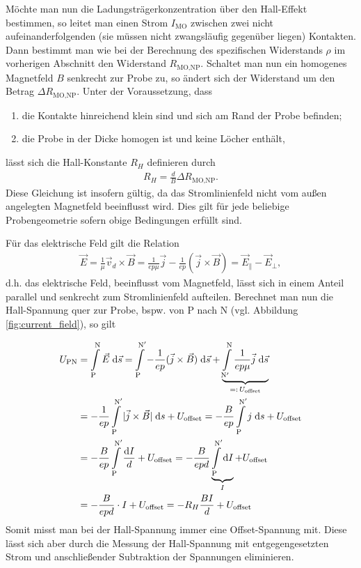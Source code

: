 \newpage
Möchte man nun die Ladungsträgerkonzentration über den Hall-Effekt bestimmen, so leitet man einen Strom $I_\text{MO}$ zwischen zwei nicht aufeinanderfolgenden (sie müssen nicht zwangsläufig gegenüber liegen) Kontakten. Dann bestimmt man wie bei der Berechnung des spezifischen Widerstands $\rho$ im vorherigen Abschnitt den Widerstand $R_\text{MO,NP}$. Schaltet man nun ein homogenes Magnetfeld $B$ senkrecht zur Probe zu, so ändert sich der Widerstand um den Betrag $\Delta R_\text{MO,NP}$.
Unter der Voraussetzung, dass
\begin{enumerate}
\item die Kontakte hinreichend klein sind und sich am Rand der Probe befinden;
\item die Probe in der Dicke homogen ist und keine Löcher enthält,
\end{enumerate}
lässt sich die Hall-Konstante $R_H$ definieren durch
\begin{align}
R_H=\frac{d}{B}\Delta R_\text{MO,NP}.
\end{align}
Diese Gleichung ist insofern gültig, da das Stromlinienfeld nicht vom außen angelegten Magnetfeld beeinflusst wird. Dies gilt für jede beliebige Probengeometrie sofern obige Bedingungen erfüllt sind.

Für das elektrische Feld gilt die Relation
\begin{align}
\vec{E}=\frac{1}{\mu}\vec{v}_d\times \vec{B}=\frac{1}{ep\mu}\vec{j}-\frac{1}{ep}(\vec{j}\times \vec{B})=\vec{E}_{\parallel}-\vec{E}_{\perp},
\end{align}
d.h. das elektrische Feld, beeinflusst vom Magnetfeld, lässt sich in einem Anteil parallel und senkrecht zum Stromlinienfeld aufteilen. Berechnet man nun die Hall-Spannung quer zur Probe, bspw. von P nach N (vgl. Abbildung \ref{fig:current_field}), so gilt

\begin{align}
U_\text{PN}&=\int\limits_{\mathrm{P}}^{\mathrm{N}}\vec{E}\;\mathrm{d} \vec{s}
=\int\limits_{\mathrm{P}}^{\mathrm{N}^\prime}-\frac{1}{ep}(\vec{j}\times \vec{B})\;\mathrm{d}\vec{s}
+\underbrace{\int\limits_{\mathrm{N}^\prime}^{\mathrm{N}}\frac{1}{ep\mu}\vec{j}\;\mathrm{d} \vec{s}}_{=:\, U_\text{offset}}\notag\\
&=-\frac{1}{ep}\int\limits_{\mathrm{P}}^{\mathrm{N}^\prime}|\vec{j}\times\vec{B}|\;\mathrm{d} s  +  U_\text{offset}
=-\frac{B}{ep}\int\limits_{\mathrm{P}}^{\mathrm{N}^\prime}j\;\mathrm{d} s  +  U_\text{offset}\notag\\
&=-\frac{B}{ep}\int\limits_{\mathrm{P}}^{\mathrm{N}^\prime}\frac{\mathrm{d} I}{d}  +  U_\text{offset}
=-\frac{B}{epd}\underbrace{\int\limits_{\mathrm{P}}^{\mathrm{N}^\prime}\mathrm{d} I}_{I}  +  U_\text{offset}\notag\\
&=-\frac{B}{epd}\cdot I +U_\text{offset}=-R_H\frac{BI}{d}+U_\text{offset}
\label{eq:U_offset}
\end{align}
Somit misst man bei der Hall-Spannung immer eine Offset-Spannung mit. Diese lässt sich aber durch die Messung der Hall-Spannung mit entgegengesetzten Strom und anschließender Subtraktion der Spannungen eliminieren.

